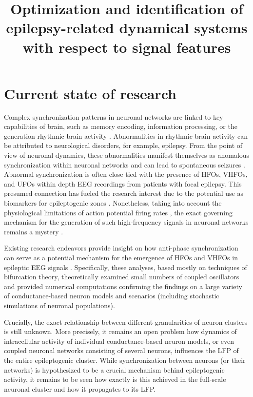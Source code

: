 \documentclass[a4paper,11pt]{scrartcl}
\title{Optimization and identification of epilepsy-related dynamical systems with respect to signal features}
\begin{document}
\maketitle
\tableofcontents

\newpage

\section{Current state of research}\label{sec:state}

Complex synchronization patterns in neuronal networks are linked to key capabilities of brain, such as memory encoding, information processing, or the generation rhythmic brain activity \cite{Izhikevich2006, Song2018}. Abnormalities in rhythmic brain activity can be attributed to neurological disorders, for example, epilepsy. From the point of view of neuronal dynamics, these abnormalities manifest themselves as anomalous synchronization within neuronal networks and can lead to spontaneous seizures \cite{Jiruska2013}. Abnormal synchronization is often close tied with the presence of \acp{HFO}, \acp{VHFO}, and \acp{UFO} within depth \ac{EEG} recordings from patients with focal epilepsy. This presumed connection has fueled the research interest due to the potential use as biomarkers for epileptogenic zones \cite{Jacobs2008, Worrell2011, Staba2011, Jacobs2012, Zijlmans2012, Brazdil2017, Cimbalnik2018, Cimbalnik2020, Brazdil2023}. Nonetheless, taking into account the physiological limitations of action potential firing rates \cite{Gabbiani2010}, the exact governing mechanism for the generation of such high-frequency signals in neuronal networks remains a mystery \cite{Jiruska2017}.

Existing research endeavors provide insight on how anti-phase synchronization can serve as a potential mechanism for the emergence of \acp{HFO} and \acp{VHFO} in epileptic \ac{EEG} signals \cite{Pribylova2024, Sevcik2024, Zathurecky2025}. Specifically, these analyses, based mostly on techniques of bifurcation theory, theoretically examined small numbers of coupled oscillators and provided numerical computations confirming the findings on a large variety of conductance-based neuron models and scenarios (including stochastic simulations of neuronal populations).

Crucially, the exact relationship between different granularities of neuron clusters is still unknown. More precisely, it remains an open problem how dynamics of intracellular activity of individual conductance-based neuron models, or even coupled neuronal networks consisting of several neurons, influences the \ac{LFP} of the entire epileptogenic cluster. While synchronization between neurons (or their networks) is hypothesized to be a crucial mechanism behind epileptogenic activity, it remains to be seen how exactly is this achieved in the full-scale neuronal cluster and how it propagates to its LFP.
\end{document}
